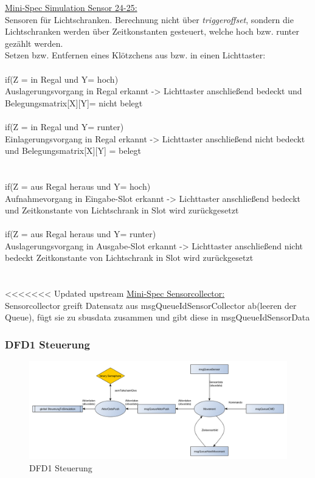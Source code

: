 \underline{Mini-Spec Simulation Sensor 24-25:}\\
Sensoren für Lichtschranken.
Berechnung nicht über \textit{triggeroffset}, sondern die Lichtschranken werden über Zeitkonstanten gesteuert, welche hoch bzw. runter gezählt werden.\\
Setzen bzw. Entfernen eines Klötzchens aus bzw. in einen Lichttaster:\\ \\
if(Z = in Regal und Y= hoch) \\
Auslagerungsvorgang in Regal erkannt -> Lichttaster anschließend bedeckt und Belegungsmatrix[X][Y]= nicht belegt\\
\\
if(Z = in Regal und Y= runter)\\
Einlagerungsvorgang in Regal erkannt -> Lichttaster anschließend nicht bedeckt und Belegungsmatrix[X][Y] = belegt \\
\\
\\
if(Z = aus Regal heraus und Y= hoch)\\
Aufnahmevorgang in Eingabe-Slot erkannt -> Lichttaster anschließend bedeckt und Zeitkonstante von Lichtschrank in Slot wird zurückgesetzt\\
\\
if(Z = aus Regal heraus und Y= runter)\\
Auslagerungsvorgang in Ausgabe-Slot erkannt -> Lichttaster anschließend nicht bedeckt  Zeitkonstante von Lichtschrank in Slot wird zurückgesetzt\ \\
\\
\\
<<<<<<< Updated upstream
\underline{Mini-Spec Sensorcollector:}\\
Sensorcollector greift Datensatz aus msgQueueIdSensorCollector ab(leeren der Queue), fügt sie zu sbusdata zusammen und gibt diese in msgQueueIdSensorData\\ 


\subsubsection{DFD1 Steuerung}
\begin{figure}[H]
	\centering
  \includegraphics[width=\textwidth]{DFD/dfd1_steuerung.png}
	\caption{DFD1 Steuerung}
	\label{fig3}
\end{figure}

